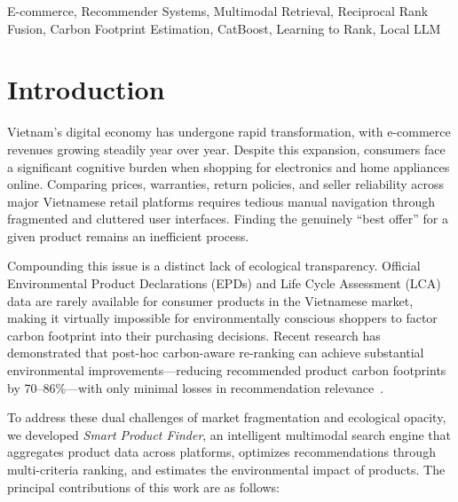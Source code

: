 \documentclass[conference]{IEEEtran}
\begin{document}
\begin{IEEEkeywords}
E-commerce, Recommender Systems, Multimodal Retrieval, Reciprocal Rank Fusion, Carbon Footprint Estimation, CatBoost, Learning to Rank, Local LLM
\end{IEEEkeywords}

\section{Introduction}

Vietnam's digital economy has undergone rapid transformation, with e-commerce revenues growing steadily year over year. Despite this expansion, consumers face a significant cognitive burden when shopping for electronics and home appliances online. Comparing prices, warranties, return policies, and seller reliability across major Vietnamese retail platforms requires tedious manual navigation through fragmented and cluttered user interfaces. Finding the genuinely ``best offer'' for a given product remains an inefficient process.

Compounding this issue is a distinct lack of ecological transparency. Official Environmental Product Declarations (EPDs) and Life Cycle Assessment (LCA) data are rarely available for consumer products in the Vietnamese market, making it virtually impossible for environmentally conscious shoppers to factor carbon footprint into their purchasing decisions. Recent research has demonstrated that post-hoc carbon-aware re-ranking can achieve substantial environmental improvements---reducing recommended product carbon footprints by 70--86\%---with only minimal losses in recommendation relevance~\cite{carbon_reranking, ecommerce_carbon}.

To address these dual challenges of market fragmentation and ecological opacity, we developed \textit{Smart Product Finder}, an intelligent multimodal search engine that aggregates product data across platforms, optimizes recommendations through multi-criteria ranking, and estimates the environmental impact of products. The principal contributions of this work are as follows:
\end{document}

